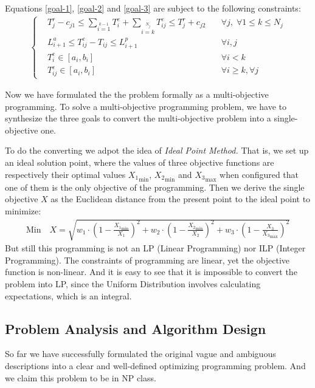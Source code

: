 \documentclass{llncs}
\begin{document}
\begin{enumerate}
     Equations \eqref{goal-1}, \eqref{goal-2} and \eqref{goal-3} are subject to the following constraints:
     \begin{align}
        \left\{
        \begin{matrix}
            &T_j^r-c_{j1}\leq\sum\limits_{i=1}\limits^{k-1}T_i^e+\sum\limits_{i=k}\limits^{N_j}T_{ij}^e\leq T_j^r+c_{j2} &\quad\forall j,\;\forall 1\leq k\leq N_j\\
            &L_{i+1}^a\leq T_{ij}^e-T_{ij}\leq L_{i+1}^p &\quad \forall i,j\\
            &T_i^e\in [a_i,b_i] &\quad\forall i<k\\
            &T_{ij}^e\in [a_i,b_i] &\quad \forall i\geq k,\forall j
        \end{matrix}    
        \right.
    \end{align}
\end{enumerate}
Now we have formulated the the problem formally as a multi-objective programming. To solve a multi-objective programming problem, we have to synthesize the three goals to convert the multi-objective problem into a single-objective one. 

To do the converting we adpot the idea of \emph{Ideal Point Method.} That is, we set up an ideal solution point, where the values of three objective functions are respectively their optimal values ${X_1}_{\min}$, ${X_2}_{\min}$ and ${X_3}_{\max}$ when configured that one of them is the only objective of the programming. Then we derive the single objective $X$ as the Euclidean distance from the present point to the ideal point to minimize:
\begin{align}\label{constraint}
    \text{Min}\quad X=\sqrt{w_1\cdot(1-\frac{{X_1}_{\min}}{X_1})^2+w_2\cdot(1-\frac{{X_2}_{\min}}{X_2})^2+w_3\cdot(1-\frac{{X_3}}{{X_3}_{\max}})^2}
\end{align}
But still this programming is not an LP (Linear Programming) nor ILP (Integer Programming). The constraints of programming are linear, yet the objective function is non-linear. And it is easy to see that it is impossible to convert the problem into LP, since the Uniform Distribution involves calculating expectations, which is an integral.
\subsection{Problem Analysis and Algorithm Design}
So far we have successfully formulated the original vague and ambiguous descriptions into a clear and well-defined optimizing programming problem. And we claim this problem to be in NP class.
\end{document}
